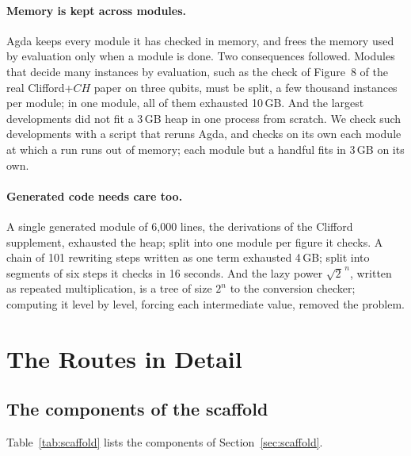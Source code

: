 \paragraph{Memory is kept across modules.} Agda keeps every module it
has checked in memory, and frees the memory used by evaluation only
when a module is done. Two consequences followed. Modules that decide
many instances by evaluation, such as the check of Figure~8 of the real
Clifford+$CH$ paper on three qubits, must be split, a few thousand
instances per module; in one module, all of them exhausted 10\,GB. And
the largest developments did not fit a 3\,GB heap in one process from
scratch. We check such developments with a script that reruns Agda,
and checks on its own each module at which a run runs out of memory;
each module but a handful fits in 3\,GB on its own.

\paragraph{Generated code needs care too.} A single generated module of
6{,}000 lines, the derivations of the Clifford supplement, exhausted the
heap; split into one module per figure it checks. A chain of 101
rewriting steps written as one term exhausted 4\,GB; split into
segments of six steps it checks in 16 seconds. And the lazy power
$\sqrt2^{\,n}$, written as repeated multiplication, is a tree of size
$2^n$ to the conversion checker; computing it level by level, forcing
each intermediate value, removed the problem.

\section{The Routes in Detail}\label{sec:appendix-routes}

\subsection{The components of the scaffold}\label{sec:scaffold-table}

Table~\ref{tab:scaffold} lists the components of Section~\ref{sec:scaffold}.

